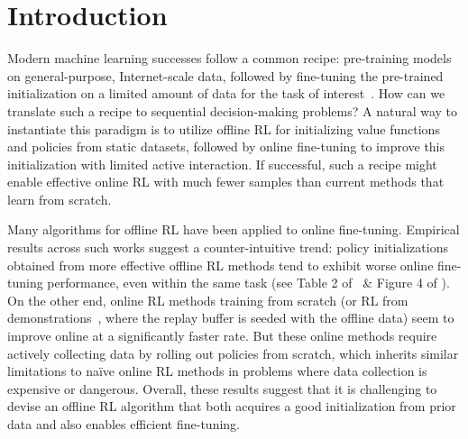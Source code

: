 \section{Introduction}
\label{Introduction}


Modern machine learning successes follow a common recipe: pre-training models on general-purpose, Internet-scale data, followed by fine-tuning the pre-trained initialization on a limited amount of data for the task of interest~\cite{he2022masked,devlin2018bert}. How can we translate such a recipe to sequential decision-making problems? A natural way to instantiate this paradigm is to utilize offline RL for initializing value functions and policies from static datasets, followed by online fine-tuning to improve this initialization with limited active interaction. If successful, such a recipe might enable effective online RL with much fewer samples than current methods that learn from scratch.

Many algorithms for offline RL have been applied to online fine-tuning. Empirical results across such works suggest a counter-intuitive trend: policy initializations obtained from more effective offline RL methods tend to exhibit worse online fine-tuning performance, even within the same task (see Table 2 of~\cite{kostrikov2021offline} \& Figure 4 of \cite{xiao2023the}). On the other end, online RL methods training from scratch (or RL from demonstrations~\cite{vecerik2017leveraging},
where the replay buffer is seeded with the offline data) seem to improve online at a significantly faster rate. But these online methods require actively collecting data by rolling out policies from scratch, which inherits similar limitations to na\"ive online RL methods in problems where data collection is expensive or dangerous. Overall, these results suggest that it is challenging to devise an offline RL algorithm that both acquires a good initialization from prior data and also enables efficient fine-tuning.

